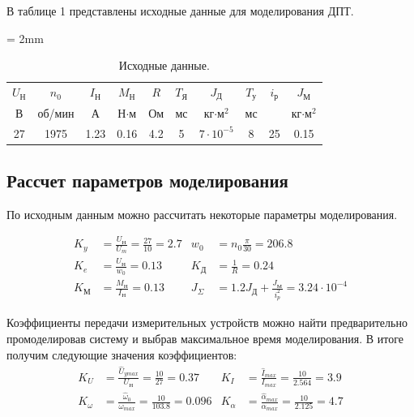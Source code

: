 \documentclass[a4paper, 12pt]{article}
\begin{document}
В таблице 1 представлены исходные данные для моделирования ДПТ.
\begin{table}[h!]
	\tabulinesep = 2mm
	\centering
	\begin{threeparttable}
 		\caption{ Исходные данные.}\label{tab:perflogcross}
   \begin{tabular}{|c|c|c|c|c|c|c|c|c|c|}
            \hline
            $U_\text{Н}$ & $n_0$ & $I_\text{Н}$ & $M_\text{Н}$ & $R$ & $T_\text{Я}$ & $J_\text{Д}$ & $T_\text{у}$ & $i_\text{р}$ & $J_\text{М}$\\
            В & об/мин & А & Н$\cdot$м & Ом & мс & кг$\cdot\text{м}^2$ & мс & &  кг$\cdot\text{м}^2$ \\ \hline
            27 & 1975 & 1.23 & 0.16 & 4.2 & 5 & $7\cdot10^{-5}$ & 8 & 25 & 0.15 \\
            \hline
        \end{tabular}

    \end{threeparttable}    
\end{table}
\newpage
\begin{center}
\section{Рассчет параметров моделирования}
\end{center}
\par По исходным данным можно рассчитать некоторые параметры моделирования.\par
\begin{align*}
    K_y & = \frac{U_\text{Н}}{U_m} = \frac{27}{10} = 2.7 & w_0 & = n_0\frac{\pi}{30} = 206.8 \\
    K_e & = \frac{U_\text{Н}}{w_0} = 0.13 & K_\text{Д} & = \frac{1}{R} = 0.24 \\
    K_\text{М} & = \frac{M_\text{Н}}{I_\text{Н}} =  0.13 & J_{\Sigma} & = 1.2J_\text{Д} + \frac{J_\text{М}}{i^2_p} = 3.24 \cdot 10^{-4}
\end{align*} \par
Коэффициенты передачи измерительных устройств можно найти предварительно промоделировав систему и выбрав максимальное время моделирования. В итоге получим следующие значения коэффициентов: 
\begin{align*}
    K_U & = \frac{\hat{U}_{ymax}}{U_\text{Н}} = \frac{10}{27} = 0.37  & K_I & = \frac{\hat{I}_{max}}{I_{max}} = \frac{10}{2.564} =  3.9\\
    K_\omega & = \frac{\hat{\omega}_{0}}{\omega_{max}} = \frac{10}{103.8} = 0.096 & K_\alpha & = \frac{\hat{\alpha}_{max}}{\alpha_{max}} = \frac{10}{2.125} = 4.7
\end{align*}
\end{document}
